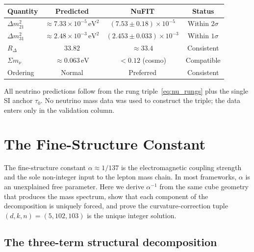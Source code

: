 \documentclass[11pt,a4paper]{article}
\theoremstyle{definition}
\theoremstyle{remark}
\begin{document}
\begin{center}
\begin{tabular}{lccc}
\toprule
Quantity & Predicted & NuFIT & Status \\
\midrule
$\Delta m^2_{21}$ & $\approx 7.33 \times 10^{-5}\,\mathrm{eV}^2$ &
  $(7.53 \pm 0.18) \times 10^{-5}$ & Within $2\sigma$ \\
$\Delta m^2_{31}$ & $\approx 2.48 \times 10^{-3}\,\mathrm{eV}^2$ &
  $(2.453 \pm 0.033) \times 10^{-3}$ & Within $1\sigma$ \\
$R_\Delta$ & $33.82$ & $\approx 33.4$ & Consistent \\
$\Sigma m_\nu$ & $\approx 0.063\,\mathrm{eV}$ & $< 0.12$ (cosmo) &
  Compatible \\
Ordering & Normal & Preferred & Consistent \\
\bottomrule
\end{tabular}
\end{center}

\noindent
All neutrino predictions follow from the rung triple~\eqref{eq:nu_rungs}
plus the single SI anchor $\tau_0$.  No neutrino mass data was used to
construct the triple; the data enters only in the validation column.


\section{The Fine-Structure Constant}
\label{sec:alpha}

The fine-structure constant $\alpha \approx 1/137$ is the electromagnetic
coupling strength and the sole non-integer input to the lepton mass chain.
In most frameworks, $\alpha$ is an unexplained free parameter.  Here we
derive $\alpha^{-1}$ from the same cube geometry that produces the mass
spectrum, show that each component of the decomposition is uniquely forced,
and prove the curvature-correction tuple $(d, k, n) = (5, 102, 103)$ is
the unique integer solution.

\subsection{The three-term structural decomposition}
\end{document}
